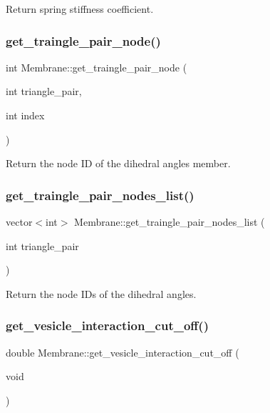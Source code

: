 Return spring stiffness coefficient. \mbox{\label{classMembrane_a30add8aa4bd6a4f03cdb3fd3e1b68ff9}} 
\subsubsection{\texorpdfstring{get\_traingle\_pair\_node()}{get\_traingle\_pair\_node()}}
{\footnotesize\ttfamily int Membrane\+::get\+\_\+traingle\+\_\+pair\+\_\+node (\begin{DoxyParamCaption}\item[{int}]{triangle\+\_\+pair,  }\item[{int}]{index }\end{DoxyParamCaption})\hspace{0.3cm}{\ttfamily [inline]}}

Return the node ID of the dihedral angles member. \mbox{\label{classMembrane_a6aaf6705d45dcc224eceace9670c15f9}} 
\subsubsection{\texorpdfstring{get\_traingle\_pair\_nodes\_list()}{get\_traingle\_pair\_nodes\_list()}}
{\footnotesize\ttfamily vector$<$int$>$ Membrane\+::get\+\_\+traingle\+\_\+pair\+\_\+nodes\+\_\+list (\begin{DoxyParamCaption}\item[{int}]{triangle\+\_\+pair }\end{DoxyParamCaption})\hspace{0.3cm}{\ttfamily [inline]}}

Return the node I\+Ds of the dihedral angles. \mbox{\label{classMembrane_ac8de522542c4c2c68ea489ce13a79bb5}} 
\subsubsection{\texorpdfstring{get\_vesicle\_interaction\_cut\_off()}{get\_vesicle\_interaction\_cut\_off()}}
{\footnotesize\ttfamily double Membrane\+::get\+\_\+vesicle\+\_\+interaction\+\_\+cut\+\_\+off (\begin{DoxyParamCaption}\item[{void}]{ }\end{DoxyParamCaption})\hspace{0.3cm}{\ttfamily [inline]}}

